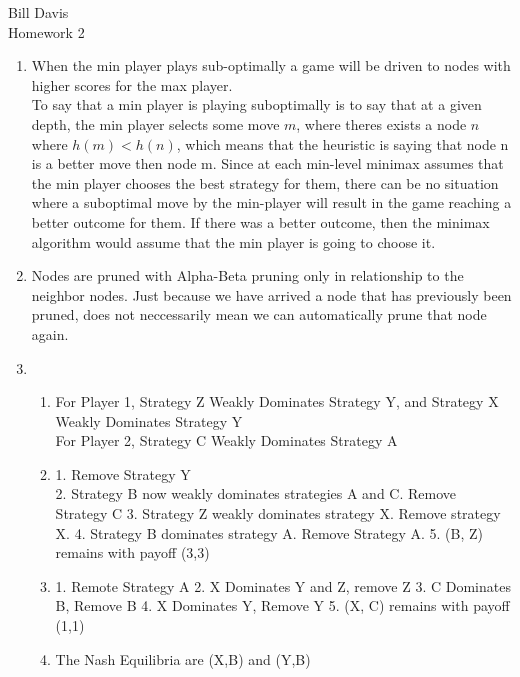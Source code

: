 \documentclass[11pt,fleqn]{article}
\begin{document}
\newcommand{\mbf}[1]{\mbox{{\bfseries #1}}}
\newcommand{\N}{\mbf{N}}
\renewcommand{\O}{\mbf{O}}

\noindent Bill Davis \\
Homework 2

\begin{enumerate}
\item %
When the min player plays sub-optimally a game will be driven to nodes with higher scores for the max player. \\

To say that a min player is playing suboptimally is to say that at a given depth, the min player selects some move $m$, where theres exists a node $n$ where $h(m) < h(n)$, which means that the heuristic is saying that node n is a better move then node m. Since at each min-level minimax assumes that the min player chooses the best strategy for them, there can be no situation where a suboptimal move by the min-player will result in the game reaching a better outcome for them. If there was a better outcome, then the minimax algorithm would assume that the min player is going to choose it. 

\item %
Nodes are pruned with Alpha-Beta pruning only in relationship to the neighbor nodes. Just because we have arrived a node that has previously been pruned, does not neccessarily mean we can automatically prune that node again. 

\item %
\begin{enumerate}
\item 
For Player 1, Strategy Z Weakly Dominates Strategy Y, and Strategy X Weakly Dominates Strategy Y \\
For Player 2, Strategy C Weakly Dominates Strategy A
\item 
1. Remove Strategy Y \\
2. Strategy B now weakly dominates strategies A and C. Remove Strategy C
3. Strategy Z weakly dominates strategy X. Remove strategy X.
4. Strategy B dominates strategy A. Remove Strategy A. 
5. (B, Z) remains with payoff (3,3)
\item 
1. Remote Strategy A
2. X Dominates Y and Z, remove Z
3. C Dominates B, Remove B
4. X Dominates Y, Remove Y
5. (X, C) remains with payoff (1,1)

\item
The Nash Equilibria are (X,B) and (Y,B)
\end{enumerate}


\end{enumerate}
\end{document}
